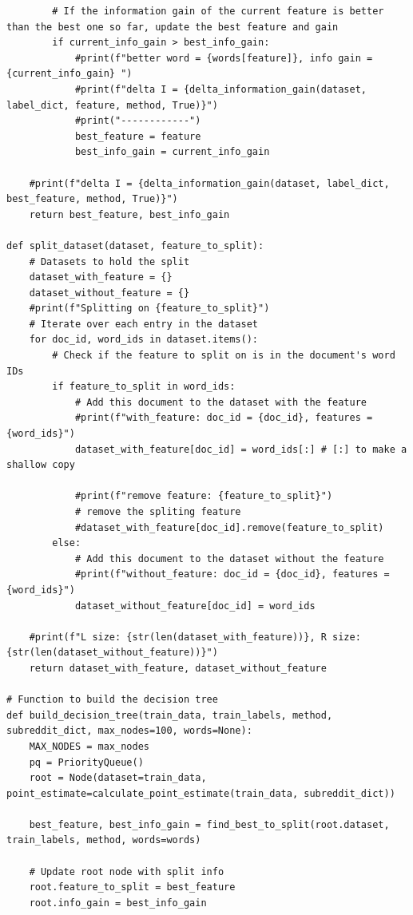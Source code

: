 \documentclass[10pt]{article}
\begin{document}
\begin{enumerate}
\begin{lstlisting}
        # If the information gain of the current feature is better than the best one so far, update the best feature and gain
        if current_info_gain > best_info_gain:
            #print(f"better word = {words[feature]}, info gain = {current_info_gain} ")
            #print(f"delta I = {delta_information_gain(dataset, label_dict, feature, method, True)}")
            #print("------------")
            best_feature = feature
            best_info_gain = current_info_gain
    
    #print(f"delta I = {delta_information_gain(dataset, label_dict, best_feature, method, True)}")
    return best_feature, best_info_gain

def split_dataset(dataset, feature_to_split):
    # Datasets to hold the split
    dataset_with_feature = {}
    dataset_without_feature = {}
    #print(f"Splitting on {feature_to_split}")
    # Iterate over each entry in the dataset
    for doc_id, word_ids in dataset.items():
        # Check if the feature to split on is in the document's word IDs
        if feature_to_split in word_ids:
            # Add this document to the dataset with the feature
            #print(f"with_feature: doc_id = {doc_id}, features = {word_ids}")
            dataset_with_feature[doc_id] = word_ids[:] # [:] to make a shallow copy
            
            #print(f"remove feature: {feature_to_split}")
            # remove the spliting feature
            #dataset_with_feature[doc_id].remove(feature_to_split)
        else:
            # Add this document to the dataset without the feature
            #print(f"without_feature: doc_id = {doc_id}, features = {word_ids}")
            dataset_without_feature[doc_id] = word_ids
    
    #print(f"L size: {str(len(dataset_with_feature))}, R size:  {str(len(dataset_without_feature))}")
    return dataset_with_feature, dataset_without_feature

# Function to build the decision tree
def build_decision_tree(train_data, train_labels, method, subreddit_dict, max_nodes=100, words=None):
    MAX_NODES = max_nodes
    pq = PriorityQueue()
    root = Node(dataset=train_data, point_estimate=calculate_point_estimate(train_data, subreddit_dict))
    
    best_feature, best_info_gain = find_best_to_split(root.dataset, train_labels, method, words=words)
    
    # Update root node with split info
    root.feature_to_split = best_feature
    root.info_gain = best_info_gain
    

\end{lstlisting}
\end{enumerate}
\end{document}
